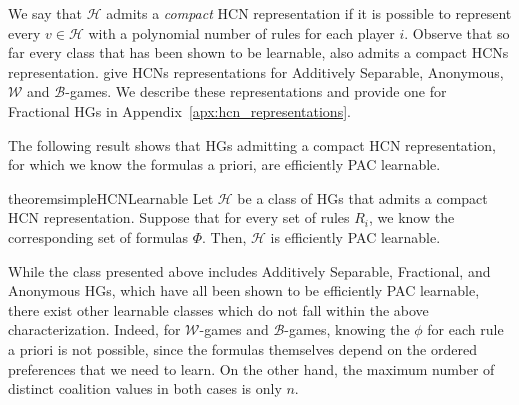 \documentclass[letterpaper]{article} %
\newcommand{\hclass}{\ensuremath{\mathcal{H}}}
\newcommand{\W}{\ensuremath{\mathcal{W}}}
\begin{document}
%
We say that $\hclass$ admits a \emph{compact} HCN representation if it is possible to represent every $v \in \hclass$ with a polynomial number of rules for each player $i$.
%
Observe that so far every class that has been shown to be learnable, also admits a compact HCNs representation. \citet{Elkind09} give HCNs representations for Additively Separable, Anonymous, $\W$ and $\mathcal{B}$-games.
We describe these representations and provide one for Fractional HGs in Appendix~\ref{apx:hcn_representations}.
%

The following result shows that HGs admitting a compact HCN representation, for which we know the formulas a priori, are efficiently PAC learnable.

\begin{restatable}{theorem}{simpleHCNLearnable}\label{thm:simple_hcn_learnable}
Let $\hclass$ be a class of HGs that admits a compact HCN representation. Suppose that for every set of rules $R_i$, we know the corresponding set of formulas $\Phi$. Then, $\hclass$ is efficiently PAC learnable.
\end{restatable}
%
%
While the class presented above includes Additively Separable, Fractional, and Anonymous HGs, which have all been shown to be efficiently PAC learnable, there exist other learnable classes which do not fall within the above characterization.
%
Indeed, for $\W$-games and $\mathcal{B}$-games, knowing the $\phi$ for each rule a priori is not possible, since the formulas themselves depend on the ordered preferences that we need to learn. On the other hand, the maximum number of distinct coalition values in both cases is only $n$.
%
\end{document}
